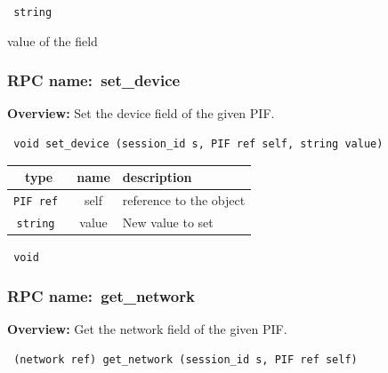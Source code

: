 \vspace{0.3cm}

{\tt 
string
}


value of the field
\vspace{0.3cm}
\vspace{0.3cm}
\vspace{0.3cm}
\subsubsection{RPC name:~set\_device}

{\bf Overview:} 
Set the device field of the given PIF.

\begin{verbatim} void set_device (session_id s, PIF ref self, string value)\end{verbatim}



 
\vspace{0.3cm}
\begin{tabular}{|c|c|p{7cm}|}
 \hline
{\bf type} & {\bf name} & {\bf description} \\ \hline
{\tt PIF ref } & self & reference to the object \\ \hline 

{\tt string } & value & New value to set \\ \hline 

\end{tabular}

\vspace{0.3cm}

{\tt 
void
}



\vspace{0.3cm}
\vspace{0.3cm}
\vspace{0.3cm}
\subsubsection{RPC name:~get\_network}

{\bf Overview:} 
Get the network field of the given PIF.

\begin{verbatim} (network ref) get_network (session_id s, PIF ref self)\end{verbatim}




